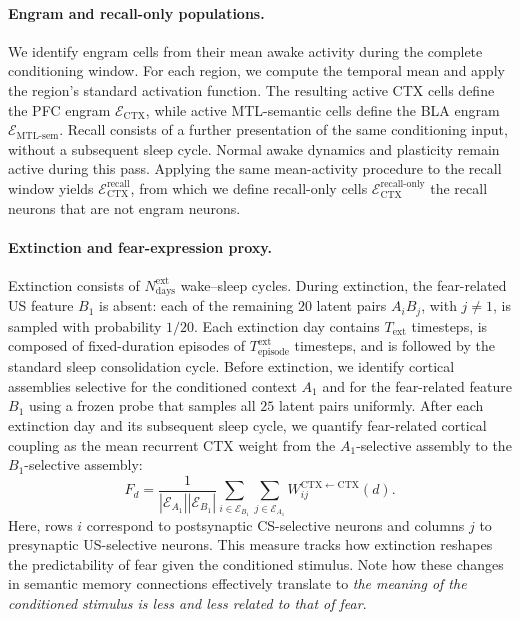 \documentclass{article}
\begin{document}
\paragraph{Engram and recall-only populations.}
We identify engram cells from their mean awake activity during the complete conditioning window. For each region, we compute the temporal mean and apply the region's standard activation function. The resulting active CTX cells define the PFC engram $\mathcal{E}_{\textrm{CTX}}$, while active MTL-semantic cells define the BLA engram $\mathcal{E}_{\textrm{MTL-sem}}$.
\newline\newline
Recall consists of a further presentation of the same conditioning input, without a subsequent sleep cycle. Normal awake dynamics and plasticity remain active during this pass. Applying the same mean-activity procedure to the recall window yields $\mathcal{E}_{\textrm{CTX}}^{\textrm{recall}}$, from which we define recall-only cells $\mathcal{E}_{\textrm{CTX}}^{\textrm{recall-only}}$ the recall neurons that are not engram neurons.
\newline\newline
\paragraph{Extinction and fear-expression proxy.}
Extinction consists of $N_{\textrm{days}}^{\textrm{ext}}$ wake--sleep cycles. During extinction, the fear-related US feature $B_1$ is absent: each of the remaining $20$ latent pairs $A_iB_j$, with $j\neq1$, is sampled with probability $1/20$. Each extinction day contains $T_{\textrm{ext}}$ timesteps, is composed of fixed-duration episodes of $T_{\textrm{episode}}^{\textrm{ext}}$ timesteps, and is followed by the standard sleep consolidation cycle.
\newline\newline
Before extinction, we identify cortical assemblies selective for the conditioned context $A_1$ and for the fear-related feature $B_1$ using a frozen probe that samples all $25$ latent pairs uniformly. After each extinction day and its subsequent sleep cycle, we quantify fear-related cortical coupling as the mean recurrent CTX weight from the $A_1$-selective assembly to the $B_1$-selective assembly:
\[
F_d
=
\frac{1}
{\left|\mathcal{E}_{A_1}\right|
 \left|\mathcal{E}_{B_1}\right|}
\sum_{i\in\mathcal{E}_{B_1}}
\sum_{j\in\mathcal{E}_{A_1}}
W^{\mathrm{CTX}\leftarrow\mathrm{CTX}}_{ij}(d).
\]
Here, rows $i$ correspond to postsynaptic CS-selective neurons and columns $j$ to presynaptic US-selective neurons. This measure tracks how extinction reshapes the predictability of fear given the conditioned stimulus. Note how these changes in semantic memory connections effectively translate to \textit{the meaning of the conditioned stimulus is less and less related to that of fear}.
\end{document}
